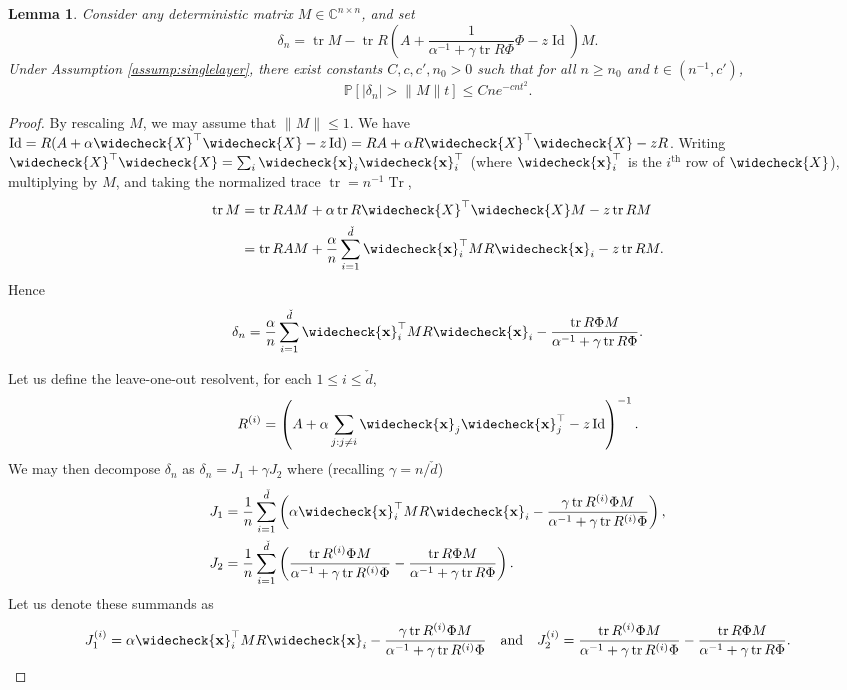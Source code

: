 \documentclass{article}
\newtheorem{lemma}[theorem]{Lemma}
\theoremstyle{definition}
\newcommand{\C}{\mathbb{C}}
\newcommand{\Id}{\operatorname{Id}}
\newcommand{\Tr}{\operatorname{Tr}}
\newcommand{\tr}{\operatorname{tr}}
\newcommand{\vd}{\check{d}}
\newcommand{\vX}{\widecheck{X}}
\renewcommand{\P}{\mathbb{P}}
\newcommand{\vx}{\widecheck{\mathbf{x}}}
\newcommand{\1}{\mathbf{1}}
\begin{document}
\begin{lemma}\label{lemma:resolvent_remainder}
Consider any deterministic matrix $M \in \C^{n \times n}$, and set
\[\delta_n=\tr M-\tr R\left(A+\frac{1}{\alpha^{-1}+\gamma \tr
R\Phi}\Phi-z\Id\right)M.\]
Under Assumption \ref{assump:singlelayer}, there exist constants
$C,c,c',n_0>0$ such that for all $n \geq n_0$ and $t \in (n^{-1},c')$,
\[\P[|\delta_n|>\|M\|t] \leq Cne^{-cnt^2}.\]
\end{lemma}
\begin{proof}
By rescaling $M$, we may assume that $\|M\| \leq 1$. We have
$\Id=R(A+\alpha \vX^\top \vX-z\Id)=RA+\alpha R\vX^\top \vX-zR$.
Writing $\vX^\top \vX=\sum_i \vx_i\vx_i^\top$ (where $\vx_i^\top$ is the
$i^\text{th}$ row of $\vX$),
multiplying by $M$, and taking the normalized trace $\tr=n^{-1}\Tr$,
\begin{align*}
\tr M&=\tr RAM+\alpha \tr R\vX^\top \vX M-z\tr RM\\
&=\tr RAM+\frac{\alpha}{n}\sum_{i=1}^{\vd} \vx_i^\top MR\vx_i-z\tr RM.
\end{align*}
Hence
\[\delta_n=\frac{\alpha}{n}\sum_{i=1}^{\vd} \vx_i^\top MR\vx_i
-\frac{\tr R\Phi M}{\alpha^{-1}+\gamma \tr R\Phi}.\]

Let us define the leave-one-out resolvent, for each $1\le i\le \vd$, 
\[R^{(i)}=\left(A+\alpha \sum_{j:j \neq i} \vx_j\vx_j^\top-z\Id\right)^{-1}.\]
We may then decompose $\delta_n$ as $\delta_n=J_1+\gamma J_2$
where (recalling $\gamma=n/\vd$)
\begin{align*}
J_1&=\frac{1}{n}\sum_{i=1}^{\vd}\left(\alpha \vx_i^\top MR\vx_i-\frac{\gamma \tr
R^{(i)}\Phi M}{\alpha^{-1}+\gamma\tr R^{(i)}\Phi}\right),\\
J_2&=\frac{1}{n}\sum_{i=1}^{\vd}\left(\frac{ \tr R^{(i)}\Phi
M}{\alpha^{-1}+\gamma\tr R^{(i)}\Phi}-\frac{ \tr R\Phi M}{\alpha^{-1}
+\gamma\tr R\Phi}\right).
\end{align*}
Let us denote these summands as
\[J_1^{(i)}=\alpha \vx_i^\top MR\vx_i-\frac{\gamma\tr R^{(i)}\Phi M}{
\alpha^{-1}+\gamma\tr R^{(i)}\Phi}\quad\text{and}\quad
J_2^{(i)}=\frac{\tr R^{(i)}\Phi M}{\alpha^{-1}+\gamma\tr R^{(i)}\Phi}-\frac{\tr
R\Phi M}{\alpha^{-1}+\gamma\tr R\Phi}.\]


\end{proof}
\end{document}
